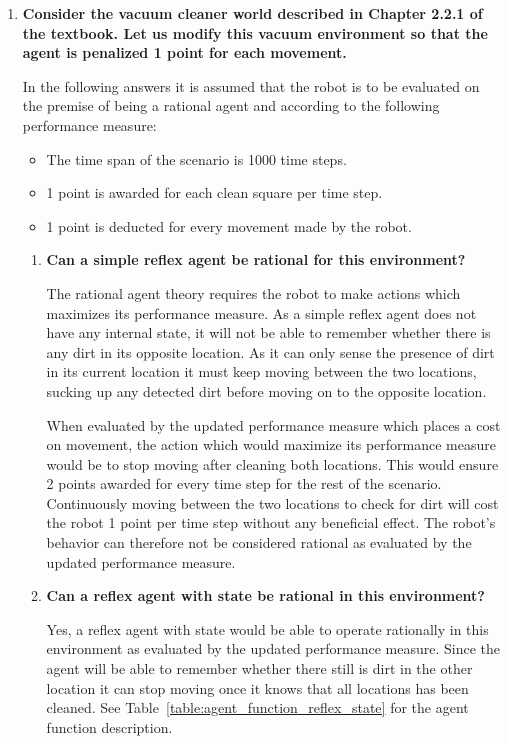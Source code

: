 \begin{enumerate}
\begin{enumerate}
\end{enumerate}

\item \textbf{Consider the vacuum cleaner world described in Chapter 2.2.1 of the textbook. Let us modify this vacuum environment so that the agent is penalized 1 point for each movement.}

In the following answers it is assumed that the robot is to be evaluated on the premise of being a rational agent and according to the following performance measure:

\begin{itemize}
\item The time span of the scenario is 1000 time steps.
\item 1 point is awarded for each clean square per time step.
\item 1 point is deducted for every movement made by the robot.
\end{itemize}

\begin{enumerate}

\item \textbf{Can a simple reflex agent be rational for this environment?} 

The rational agent theory requires the robot to make actions which maximizes its performance measure. As a simple reflex agent does not have any internal state, it will not be able to remember whether there is any dirt in its opposite location. As it can only sense the presence of dirt in its current location it must keep moving between the two locations, sucking up any detected dirt before moving on to the opposite location. 

When evaluated by the updated performance measure which places a cost on movement, the action which would maximize its performance measure would be to stop moving after cleaning both locations. This would ensure 2 points awarded for every time step for the rest of the scenario. Continuously moving between the two locations to check for dirt will cost the robot 1 point per time step without any beneficial effect. The robot's behavior can therefore not be considered rational as evaluated by the updated performance measure. 

\item \textbf{Can a reflex agent with state be rational in this environment?}

Yes, a reflex agent with state would be able to operate rationally in this environment as evaluated by the updated performance measure. Since the agent will be able to remember whether there still is dirt in the other location it can stop moving once it knows that all locations has been cleaned. See Table~\ref{table:agent_function_reflex_state} for the agent function description.


\end{enumerate}
\end{enumerate}
